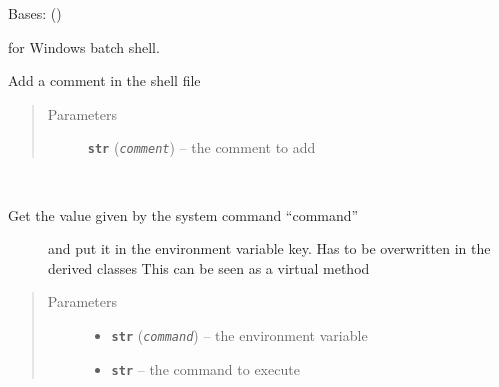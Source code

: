 \documentclass[a4paper,10pt,english]{sphinxmanual}
\begin{document}
\begin{fulllineitems}
\label{commands/apidoc/src:src.fileEnviron.BatFileEnviron}
Bases: {\hyperref[commands/apidoc/src:src.fileEnviron.FileEnviron]{}} ()

for Windows batch shell.

\begin{fulllineitems}
\label{commands/apidoc/src:src.fileEnviron.BatFileEnviron.add_comment}
Add a comment in the shell file
\begin{quote}\begin{description}
\item[{Parameters}] \leavevmode
\textbf{\texttt{str}} (\emph{\texttt{comment}}) -- the comment to add

\end{description}\end{quote}

\end{fulllineitems}


\begin{fulllineitems}
\label{commands/apidoc/src:src.fileEnviron.BatFileEnviron.command_value}~\begin{description}
\item[{Get the value given by the system command ``command'' }] \leavevmode
and put it in the environment variable key.
Has to be overwritten in the derived classes
This can be seen as a virtual method

\end{description}
\begin{quote}\begin{description}
\item[{Parameters}] \leavevmode\begin{itemize}
\item {} 
\textbf{\texttt{str}} (\emph{\texttt{command}}) -- the environment variable

\item {} 
\textbf{\texttt{str}} -- the command to execute


\end{itemize}
\end{description}
\end{quote}
\end{fulllineitems}
\end{fulllineitems}
\end{document}
